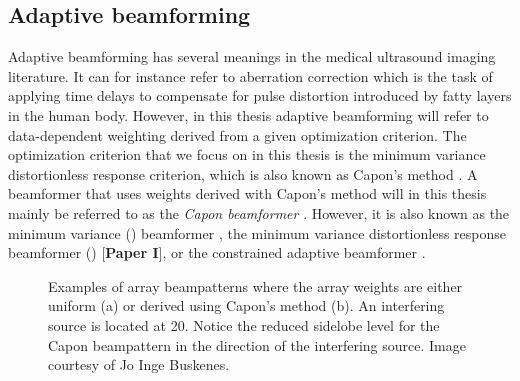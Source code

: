 \subsection{Adaptive beamforming}\label{sec:adaptbf}
Adaptive beamforming has several meanings in the medical ultrasound imaging literature. It can for instance refer to aberration correction \cite{cole1996method} which is the task of applying time delays to compensate for pulse distortion introduced by fatty layers in the human body. However, in this thesis adaptive beamforming will refer to data-dependent weighting derived from a given optimization criterion. The optimization criterion that we focus on in this thesis is the minimum variance distortionless response criterion, which is also known as Capon's method \cite{Capon1969}. A beamformer that uses weights derived with Capon's method will in this thesis mainly be referred to as the \textit{Capon beamformer} \cite{Vignon2008}. However, it is also known as the minimum variance  () beamformer \cite{Synnevag2007}, the minimum variance distortionless response beamformer () [\textbf{Paper I}], or the constrained adaptive beamformer \cite{Mann2002}.

\begin{figure}[t!]
\caption{Examples of array beampatterns where the array weights are either uniform (a) or derived using Capon's method (b). An interfering source is located at 20\degree. Notice the reduced sidelobe level for the Capon beampattern in the direction of the interfering source. Image courtesy of Jo Inge Buskenes.}
\label{fig:weights}
\end{figure}


